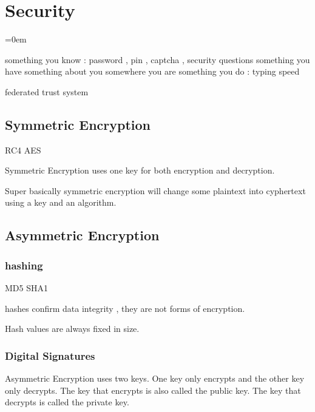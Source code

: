
\section{Security}
\label{sec:security}
\parindent=0em

something you know : password , pin , captcha , security questions
something you have
something about you
somewhere you are
something you do : typing speed

federated trust system

\subsection{Symmetric Encryption}
\label{ssec:symmetric_encryption}

RC4
AES

Symmetric Encryption uses one key for both encryption and decryption.

Super basically symmetric encryption will change some plaintext into cyphertext
using a key and an algorithm.

\subsectionend

\subsection{Asymmetric Encryption}
\label{ssec:asymmetric_encryption}

\subsubsection{hashing}
\label{sssec:hashing}

MD5
SHA1

hashes confirm data integrity , they are not forms of encryption.

Hash values are always fixed in size.



\subsubsectionend

\subsubsection{Digital Signatures}
\label{sssec:digital_signatures}

Asymmetric Encryption uses two keys. One key only encrypts and the other key
only decrypts. The key that encrypts is also called the public key. The key that
decrypts is called the private key.

